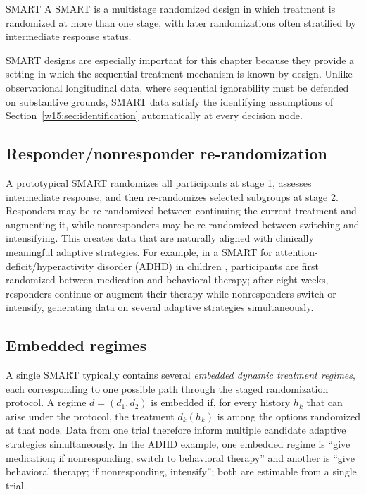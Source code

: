 \documentclass[master.tex]{subfiles}
\begin{document}
\begin{defn}{SMART}
\label{w15:defn:smart}
A SMART is a multistage randomized design in which treatment is randomized at more than one stage, with later randomizations often stratified by intermediate response status.
\end{defn}

SMART designs are especially important for this chapter because they provide a setting in which the sequential treatment mechanism is known by design. Unlike observational longitudinal data, where sequential ignorability must be defended on substantive grounds, SMART data satisfy the identifying assumptions of Section~\ref{w15:sec:identification} automatically at every decision node.

\subsection{Responder/nonresponder re-randomization}

A prototypical SMART randomizes all participants at stage 1, assesses intermediate response, and then re-randomizes selected subgroups at stage 2. Responders may be re-randomized between continuing the current treatment and augmenting it, while nonresponders may be re-randomized between switching and intensifying. This creates data that are naturally aligned with clinically meaningful adaptive strategies. For example, in a SMART for attention-deficit/hyperactivity disorder (ADHD) in children \citep{murphy2005experimental}, participants are first randomized between medication and behavioral therapy; after eight weeks, responders continue or augment their therapy while nonresponders switch or intensify, generating data on several adaptive strategies simultaneously.

\subsection{Embedded regimes}

A single SMART typically contains several \emph{embedded dynamic treatment regimes}, each corresponding to one possible path through the staged randomization protocol. A regime $d = (d_1, d_2)$ is embedded if, for every history $h_k$ that can arise under the protocol, the treatment $d_k(h_k)$ is among the options randomized at that node. Data from one trial therefore inform multiple candidate adaptive strategies simultaneously. In the ADHD example, one embedded regime is ``give medication; if nonresponding, switch to behavioral therapy'' and another is ``give behavioral therapy; if nonresponding, intensify''; both are estimable from a single trial.
\end{document}
